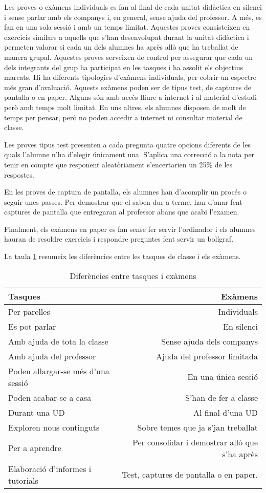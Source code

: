 \documentclass[catalan, a4paper, 12pt, titlepage]{article}
\begin{document}
Les proves o exàmens individuals es fan al final de cada unitat didàctica en silenci i sense parlar amb els companys i, en general, sense ajuda del professor.
A més, es fan en una sola sessió i amb un temps limitat.
Aquestes proves consisteixen en exercicis similars a aquells que s'han desenvolupat durant la unitat didàctica i permeten valorar si cada un dels alumnes ha après allò que ha treballat de manera grupal.
Aquestes proves serveixen de control per assegurar que cada un dels integrants del grup ha participat en les tasques i ha assolit els objectius marcats.
Hi ha diferents tipologies d'exàmens individuals, per cobrir un espectre més gran d'avaluació. Aquests exàmens poden ser de tipus test, de captures de pantalla o en paper. 
Alguns són amb accés lliure a internet i al material d'estudi però amb temps molt limitat.
En uns altres, els alumnes disposen de molt de temps per pensar, però no poden accedir a internet ni consultar material de classe.

Les proves tipus test presenten a cada pregunta quatre opcions diferents de les quals l'alumne n'ha d'elegir únicament una.
S'aplica una correcció a la nota per tenir en compte que responent aleatòriament s'encertarien un 25\% de les respostes.

En les proves de captura de pantalla, els alumnes han d'acomplir un procés o seguir unes passes.
Per demostrar que el saben dur a terme, han d'anar fent captures de pantalla que entregaran al professor abans que acabi l'examen.

Finalment, els exàmens en paper es fan sense fer servir l'ordinador i els alumnes hauran de resoldre exercicis i respondre preguntes fent servir un bolígraf.

La taula \ref{tab:tasquesiexamens} resumeix les diferències entre les tasques de classe i els exàmens.

\begin{table}
	\small
        \centering
        \begin{tabular}{lr}
        Tasques & Exàmens\\
        \hline
	Per parelles & Individuals\\
		Es pot parlar & En silenci \\
		Amb ajuda de tota la classe &Sense ajuda dels companys\\
		Amb ajuda del professor & Ajuda del professor limitada\\
		Poden allargar-se més d'una sessió & En una única sessió\\
		Poden acabar-se a casa & S'han de fer a classe\\
		Durant una UD & Al final d'una UD \\
		Exploren nous continguts & Sobre temes que ja s'jan treballat\\
		Per a aprendre & Per consolidar i demostrar allò que s'ha après\\
		Elaboració d'informes i tutorials & Test, captures de pantalla o en paper.

\end{tabular}
        \caption{Diferències entre tasques i exàmens} \label{tab:tasquesiexamens}
\end{table}
\end{document}
